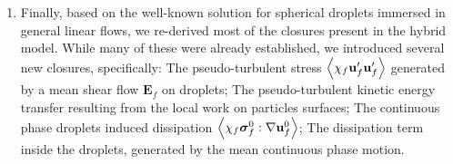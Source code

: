 \begin{enumerate}
    \item Finally, based on the well-known solution for spherical droplets immersed in general linear flows, we re-derived most of the closures present in the hybrid model. 
    While many of these were already established, we introduced several new closures, specifically: 
    The pseudo-turbulent stress $\left<\chi_f \textbf{u}_f'\textbf{u}_f'\right>$ generated by a mean shear flow $\textbf{E}_f$ on droplets; 
    The pseudo-turbulent kinetic energy transfer resulting from the local work on particles surfaces; 
    The continuous phase droplets induced dissipation $\left<\chi_f \bm\sigma_f^0:\mathbf{\nabla} \textbf{u}_f^0\right>$; 
    The dissipation term inside the droplets, generated by the mean continuous phase motion. 
\end{enumerate}

 
